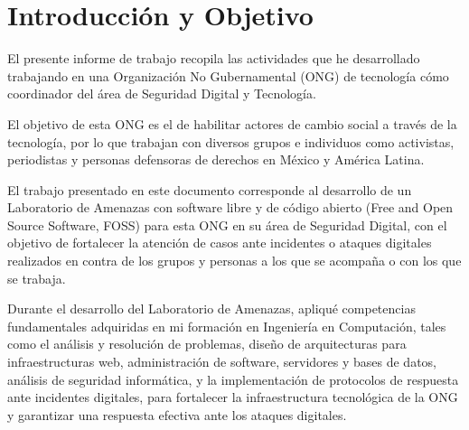 \documentclass[12pt]{caltech_thesis}
\begin{document}

\chapter{Introducción y Objetivo}


El presente informe de trabajo recopila las actividades que he desarrollado trabajando en una Organización No Gubernamental (ONG)  de tecnología cómo coordinador del área de Seguridad Digital y Tecnología.

El objetivo de esta ONG es el de habilitar actores de cambio social a través de la tecnología, por lo que trabajan con diversos grupos e individuos como activistas, periodistas y personas defensoras de derechos en México y América Latina.

El trabajo presentado en este documento corresponde al desarrollo de un Laboratorio de Amenazas  con software libre y de código abierto (Free and Open Source Software, FOSS)  para esta ONG en su área de Seguridad Digital, con el objetivo de fortalecer la atención de casos ante incidentes  o ataques digitales  realizados en contra de los grupos y personas a los que se acompaña o con los que se trabaja.

Durante el desarrollo del Laboratorio de Amenazas, apliqué competencias fundamentales adquiridas en mi formación en Ingeniería en Computación, tales como el análisis y resolución de problemas, diseño de arquitecturas para infraestructuras web, administración de software, servidores y bases de datos, análisis de seguridad informática, y la implementación de protocolos de respuesta ante incidentes digitales, para fortalecer la infraestructura tecnológica de la ONG y garantizar una respuesta efectiva ante los ataques digitales.
\end{document}
